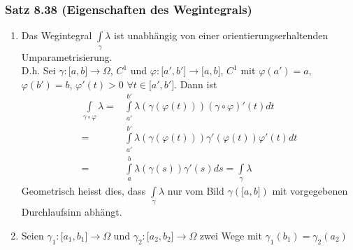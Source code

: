 \subsubsection*{Satz 8.38 (Eigenschaften des Wegintegrals)}
\begin{enumerate}[\indent E1)]
\item Das Wegintegral $\int\limits_\gamma  \lambda  $ ist unabhängig von einer orientierungserhaltenden Umparametrisierung. \\
D.h. Sei $\gamma :\lbrack a,b\rbrack\to\Omega$, $C^1$ und $\varphi :\lbrack a',b'\rbrack\to\lbrack a,b\rbrack$, $C^1$ mit $\varphi\left( a'\right)=a$, $\varphi\left( b'\right)=b$, $\varphi'\left( t\right) >0$ $\forall t\in\lbrack a', b'\rbrack$. Dann ist
\begin{align*}
\int\limits_{\gamma  \circ \varphi } \lambda   = &\int\limits_{a'}^{b'} {\lambda \left( {\gamma \left( {\varphi (t)} \right)} \right)\left( {\gamma  \circ \varphi } \right)'(t)dt} \\
 = &\int\limits_{a'}^{b'} {\lambda \left( {\gamma \left( {\varphi (t)} \right)} \right)\gamma '\left( {\varphi (t)} \right)\varphi '(t)dt} \\
 = &\int\limits_a^b {\lambda \left( {\gamma \left( s \right)} \right)\gamma '\left( s \right)ds = \int\limits_\gamma  \lambda  }
\end{align*}
Geometrisch heisst dies, dass $\int\limits_\gamma  \lambda$ nur vom Bild $\gamma\left( \lbrack a,b\rbrack\right)$ mit vorgegebenen Durchlaufsinn abhängt.
\item Seien $\gamma_1:\lbrack a_1,b_1\rbrack\to\Omega$ und $\gamma_2:\lbrack a_2,b_2\rbrack\to\Omega$ zwei Wege mit $\gamma_1\left( b_1\right)=\gamma_2\left(a_2\right)$
\begin{center}
\end{center}
\end{enumerate}
